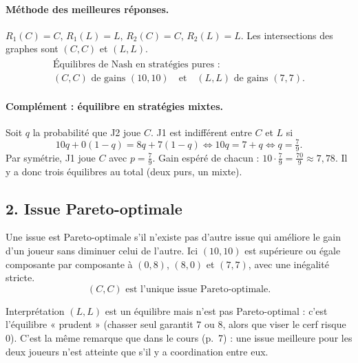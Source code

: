 \documentclass[11pt,a4paper]{article}
\begin{document}
\paragraph{Méthode des meilleures réponses.} $R_1(C)=C$, $R_1(L)=L$, $R_2(C)=C$, $R_2(L)=L$. Les intersections des graphes sont $(C,C)$ et $(L,L)$.
\[
\boxed{\begin{array}{c}\text{Équilibres de Nash en stratégies pures :}\\ (C,C) \text{ de gains } (10,10) \quad\text{et}\quad (L,L) \text{ de gains } (7,7).\end{array}}
\]

\paragraph{Complément : équilibre en stratégies mixtes.} Soit $q$ la probabilité que J2 joue $C$. J1 est indifférent entre $C$ et $L$ si
\[
10q+0(1-q)=8q+7(1-q)\iff 10q=7+q\iff q=\tfrac79.
\]
Par symétrie, J1 joue $C$ avec $p=\frac79$. Gain espéré de chacun : $10\cdot\frac79=\frac{70}{9}\approx7{,}78$. Il y a donc trois équilibres au total (deux purs, un mixte).

\subsection*{2. Issue Pareto-optimale}
Une issue est Pareto-optimale s'il n'existe pas d'autre issue qui améliore le gain d'un joueur sans diminuer celui de l'autre. Ici $(10,10)$ est supérieure ou égale composante par composante à $(0,8)$, $(8,0)$ et $(7,7)$, avec une inégalité stricte.
\[
\boxed{(C,C) \text{ est l'unique issue Pareto-optimale.}}
\]
\begin{rembox}{Interprétation}
$(L,L)$ est un équilibre mais n'est pas Pareto-optimal : c'est l'équilibre « prudent » (chasser seul garantit $7$ ou $8$, alors que viser le cerf risque $0$). C'est la même remarque que dans le cours (p.~7) : une issue meilleure pour les deux joueurs n'est atteinte que s'il y a coordination entre eux.
\end{rembox}

\end{document}
